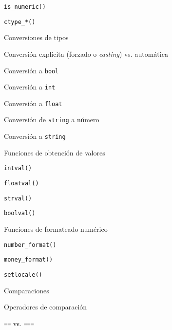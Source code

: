 \begin{longenum}
\begin{longenum}
\begin{longenum}
\begin{longenum}
\begin{longenum}
                    \item \texttt{is\_numeric()}
                    \item \texttt{ctype\_*()}
                \end{longenum}
            \end{longenum}
            \item Conversiones de tipos
            \begin{longenum}
                \item Conversión explícita (forzado o \textit{casting}) vs. automática
                \item Conversión a \texttt{bool}
                \item Conversión a \texttt{int}
                \item Conversión a \texttt{float}
                \item Conversión de \texttt{string} a número
                \item Conversión a \texttt{string}
                \item Funciones de obtención de valores
                \begin{longenum}
                    \item \texttt{intval()}
                    \item \texttt{floatval()}
                    \item \texttt{strval()}
                    \item \texttt{boolval()}
                \end{longenum}
                \item Funciones de formateado numérico
                \begin{longenum}
                    \item \texttt{number\_format()}
                    \item \texttt{money\_format()}
                    \begin{longenum}
                        \item \texttt{setlocale()}
                    \end{longenum}
                \end{longenum}
            \end{longenum}
            \item Comparaciones
            \begin{longenum}
                \item Operadores de comparación
                \item \texttt{==} vs. \texttt{===}

\end{longenum}
\end{longenum}
\end{longenum}
\end{longenum}
